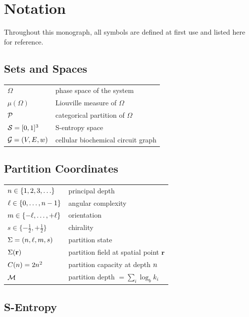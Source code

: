 
\chapter*{Notation}

Throughout this monograph, all symbols are defined at first use and listed
here for reference.

\section*{Sets and Spaces}

\begin{tabular}{ll}
$\Omega$ & phase space of the system \\
$\mu(\Omega)$ & Liouville measure of $\Omega$ \\
$\mathcal{P}$ & categorical partition of $\Omega$ \\
$\mathcal{S} = [0,1]^3$ & S-entropy space \\
$\mathcal{G} = (V,E,w)$ & cellular biochemical circuit graph \\
\end{tabular}

\section*{Partition Coordinates}

\begin{tabular}{ll}
$n \in \{1,2,3,\ldots\}$ & principal depth \\
$\ell \in \{0,\ldots,n-1\}$ & angular complexity \\
$m \in \{-\ell,\ldots,+\ell\}$ & orientation \\
$s \in \{-\tfrac{1}{2},+\tfrac{1}{2}\}$ & chirality \\
$\Sigma = (n,\ell,m,s)$ & partition state \\
$\Sigma(\mathbf{r})$ & partition field at spatial point $\mathbf{r}$ \\
$C(n) = 2n^2$ & partition capacity at depth $n$ \\
$\mathcal{M}$ & partition depth $= \sum_i \log_b k_i$ \\
\end{tabular}

\section*{S-Entropy}

